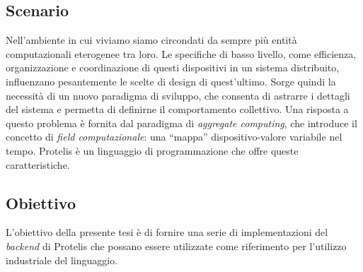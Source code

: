 \subsection{Scenario}

Nell'ambiente in cui viviamo siamo circondati da sempre più entità computazionali eterogenee tra loro. Le specifiche di basso livello, come efficienza, organizzazione e coordinazione di questi dispositivi in un sistema distribuito, influenzano pesantemente le scelte di design di quest'ultimo. Sorge quindi la necessità di un nuovo paradigma di sviluppo, che consenta di astrarre i dettagli del sistema e permetta di definirne il comportamento collettivo. Una risposta a questo problema è fornita dal paradigma di \textit{aggregate computing}, che introduce il concetto di \textit{field computazionale}: una ``mappa'' dispositivo-valore variabile nel tempo. Protelis è un linguaggio di programmazione che offre queste caratteristiche.


\subsection{Obiettivo}

L'obiettivo della presente tesi è di fornire una serie di implementazioni del \textit{backend} di Protelis che possano essere utilizzate come riferimento per l'utilizzo industriale del linguaggio.
